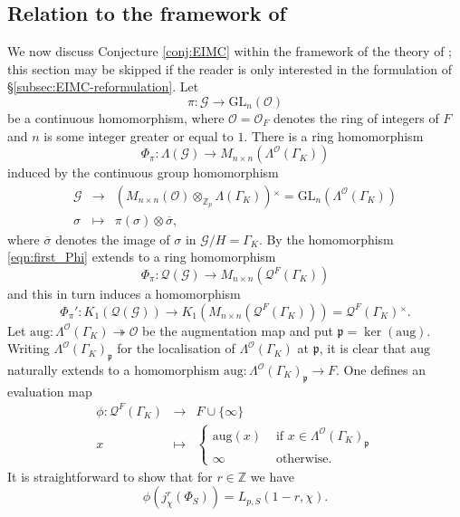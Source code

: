 \documentclass[12pt]{amsart}
\theoremstyle{plain}
\theoremstyle{remark}
\theoremstyle{definition}
\numberwithin{equation}{section}
\begin{document}
\subsection{Relation to the framework of \cite{MR2217048}}
We now discuss Conjecture \ref{conj:EIMC} within the framework of the theory of \cite[\S 3]{MR2217048};
this section may be skipped if the reader is only interested in the formulation of \S \ref{subsec:EIMC-reformulation}.
Let
\[
\pi: \mathcal{G} \rightarrow {\mathrm{GL}}_{n}(\mathcal{O})
\]
be a continuous homomorphism, where $\mathcal{O}=\mathcal{O}_{F}$ denotes the ring of integers of $F$
and $n$ is some integer greater or equal to $1$.
There is a ring homomorphism
\begin{equation} \label{eqn:first_Phi}
\Phi_{\pi}: \Lambda(\mathcal{G}) \rightarrow M_{n\times n}(\Lambda^{\mathcal{O}}(\Gamma_{K}))
\end{equation}
induced by the continuous group homomorphism
\begin{eqnarray*}
\mathcal{G} & \rightarrow & (M_{n \times n}(\mathcal{O}) \otimes_{{\mathbb{Z}}_p} \Lambda(\Gamma_{K})){^{\times}} = {\mathrm{GL}}_{n}(\Lambda^{\mathcal{O}}(\Gamma_{K}))\\
\sigma & \mapsto & \pi(\sigma) \otimes \overline{\sigma},
\end{eqnarray*}
where $\overline{\sigma}$ denotes the image of $\sigma$ in $\mathcal{G} / H = \Gamma_{K}$. 
By \cite[Lemma 3.3]{MR2217048} the
homomorphism \eqref{eqn:first_Phi} extends to a ring homomorphism
\[
\Phi_{\pi}: \mathcal{Q}(\mathcal{G}) \rightarrow M_{n\times n}(\mathcal{Q}^{F}(\Gamma_{K}))
\]
and this in turn induces a homomorphism
\[
\Phi_{\pi}': K_{1}(\mathcal{Q}(\mathcal{G})) \rightarrow 
K_{1}(M_{n\times n}(\mathcal{Q}^{F}(\Gamma_{K}))) = \mathcal{Q}^{F}(\Gamma_{K}){^{\times}}.
\]
Let ${\mathrm{aug}}: \Lambda^{\mathcal{O}}(\Gamma_{K}) \twoheadrightarrow \mathcal{O}$ be the augmentation map and put $\mathfrak{p} = \ker({\mathrm{aug}})$.
Writing $\Lambda^{\mathcal{O}}(\Gamma_{K})_{\mathfrak{p}}$ for the localisation of $\Lambda^{\mathcal{O}}(\Gamma_{K})$ at $\mathfrak{p}$, it is clear that ${\mathrm{aug}}$ naturally extends to a homomorphism ${\mathrm{aug}}: \Lambda^{\mathcal{O}}(\Gamma_{K})_{\mathfrak{p}} \rightarrow F$.
One defines an evaluation map
\begin{equation} \label{eqn:evaluation-map}
\begin{array}{rcl}
\phi: \mathcal{Q}^{F}(\Gamma_{K}) & \rightarrow & F \cup \{\infty\}\\
x & \mapsto & \left\{ \begin{array}{ll} {\mathrm{aug}} (x) & \mbox{ if } x \in \Lambda^{\mathcal{O}}(\Gamma_{K})_{\mathfrak{p}}\\
\infty & \mbox{ otherwise}. \end{array} \right.
\end{array}
\end{equation}
It is straightforward to show that for $r \in {\mathbb{Z}}$ we have
\begin{equation}\label{eq:PhiS-jr-p-adic}
\phi(j_{\chi}^{r}(\Phi_{S})) = L_{p,S}(1-r, \chi). 
\end{equation}
\end{document}
